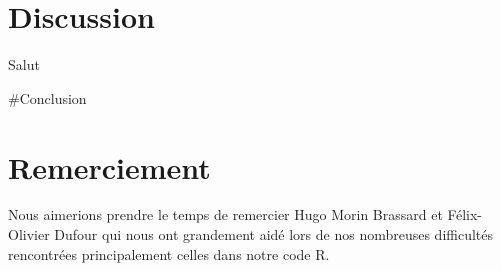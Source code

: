 \documentclass[preprint, 3p,
authoryear]{elsarticle} %
\begin{document}
\hypertarget{discussion}{%
\section{Discussion}\label{discussion}}

Salut

\#Conclusion

\hypertarget{remerciement}{%
\section{Remerciement}\label{remerciement}}

Nous aimerions prendre le temps de remercier Hugo Morin Brassard et
Félix-Olivier Dufour qui nous ont grandement aidé lors de nos nombreuses
difficultés rencontrées principalement celles dans notre code R.

\renewcommand\refname{References}

\end{document}
